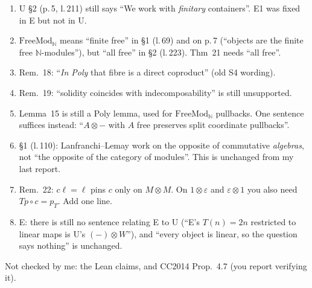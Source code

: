 \documentclass[11pt]{article}
\newcommand{\N}{\mathbb{N}}
\begin{document}
\begin{enumerate}[label=\textbf{C\arabic*.},leftmargin=*]
\item U \S2 (p.\,5, l.\,211) still says ``We work with \emph{finitary} containers''. E1 was fixed
in E but not in U.
\item $\mathrm{FreeMod}_\N$ means ``finite free'' in \S1 (l.\,69) and on p.\,7 (``objects are the
finite free $\N$-modules''), but ``all free'' in \S2 (l.\,223). Thm~21 needs ``all free''.
\item Rem.~18: ``\emph{In Poly} that fibre is a direct coproduct'' (old S4 wording).
\item Rem.~19: ``solidity coincides with indecomposability'' is still unsupported.
\item Lemma~15 is still a Poly lemma, used for $\mathrm{FreeMod}_\N$ pullbacks. One sentence
suffices instead: ``$A\otimes-$ with $A$ free preserves split coordinate pullbacks''.
\item \S1 (l.\,110): Lanfranchi--Lemay work on the opposite of commutative \emph{algebras}, not
``the opposite of the category of modules''. This is unchanged from my last report.
\item Rem.~22: $c\ell=\ell$ pins $c$ only on $M\otimes M$. On $1\otimes\varepsilon$ and
$\varepsilon\otimes1$ you also need $Tp\circ c=p_T$. Add one line.
\item E: there is still no sentence relating E to U (``E's $T(n)=2n$ restricted to linear maps is U's
$(-)\otimes W$''), and ``every object is linear, so the question says nothing'' is unchanged.
\end{enumerate}
Not checked by me: the Lean claims, and CC2014 Prop.~4.7 (you report verifying it).
\end{document}
